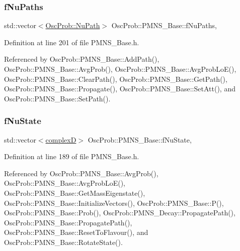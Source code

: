 \subsubsection{\texorpdfstring{f\+Nu\+Paths}{fNuPaths}}
{\footnotesize\ttfamily std\+::vector$<$\hyperlink{structOscProb_1_1NuPath}{Osc\+Prob\+::\+Nu\+Path}$>$ Osc\+Prob\+::\+P\+M\+N\+S\+\_\+\+Base\+::f\+Nu\+Paths\hspace{0.3cm}{\ttfamily [protected]}, {\ttfamily [inherited]}}



Definition at line 201 of file P\+M\+N\+S\+\_\+\+Base.\+h.



Referenced by Osc\+Prob\+::\+P\+M\+N\+S\+\_\+\+Base\+::\+Add\+Path(), Osc\+Prob\+::\+P\+M\+N\+S\+\_\+\+Base\+::\+Avg\+Prob(), Osc\+Prob\+::\+P\+M\+N\+S\+\_\+\+Base\+::\+Avg\+Prob\+Lo\+E(), Osc\+Prob\+::\+P\+M\+N\+S\+\_\+\+Base\+::\+Clear\+Path(), Osc\+Prob\+::\+P\+M\+N\+S\+\_\+\+Base\+::\+Get\+Path(), Osc\+Prob\+::\+P\+M\+N\+S\+\_\+\+Base\+::\+Propagate(), Osc\+Prob\+::\+P\+M\+N\+S\+\_\+\+Base\+::\+Set\+Att(), and Osc\+Prob\+::\+P\+M\+N\+S\+\_\+\+Base\+::\+Set\+Path().

\mbox{\label{classOscProb_1_1PMNS__Base_abf99f2339e3ee989600740b5d88063e8}} 
\subsubsection{\texorpdfstring{f\+Nu\+State}{fNuState}}
{\footnotesize\ttfamily std\+::vector$<$\hyperlink{EigenPoint_8h_a67ca8e107e20610c3fff78d5e726ece0}{complexD}$>$ Osc\+Prob\+::\+P\+M\+N\+S\+\_\+\+Base\+::f\+Nu\+State\hspace{0.3cm}{\ttfamily [protected]}, {\ttfamily [inherited]}}



Definition at line 189 of file P\+M\+N\+S\+\_\+\+Base.\+h.



Referenced by Osc\+Prob\+::\+P\+M\+N\+S\+\_\+\+Base\+::\+Avg\+Prob(), Osc\+Prob\+::\+P\+M\+N\+S\+\_\+\+Base\+::\+Avg\+Prob\+Lo\+E(), Osc\+Prob\+::\+P\+M\+N\+S\+\_\+\+Base\+::\+Get\+Mass\+Eigenstate(), Osc\+Prob\+::\+P\+M\+N\+S\+\_\+\+Base\+::\+Initialize\+Vectors(), Osc\+Prob\+::\+P\+M\+N\+S\+\_\+\+Base\+::\+P(), Osc\+Prob\+::\+P\+M\+N\+S\+\_\+\+Base\+::\+Prob(), Osc\+Prob\+::\+P\+M\+N\+S\+\_\+\+Decay\+::\+Propagate\+Path(), Osc\+Prob\+::\+P\+M\+N\+S\+\_\+\+Base\+::\+Propagate\+Path(), Osc\+Prob\+::\+P\+M\+N\+S\+\_\+\+Base\+::\+Reset\+To\+Flavour(), and Osc\+Prob\+::\+P\+M\+N\+S\+\_\+\+Base\+::\+Rotate\+State().

